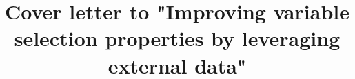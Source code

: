 \documentclass{imsart}
\theoremstyle{plain}
\begin{document}
\begin{frontmatter}
\title{Cover letter to "Improving variable selection properties by leveraging external data"}

\begin{aug}
\end{aug}






\end{frontmatter}
\end{document}
